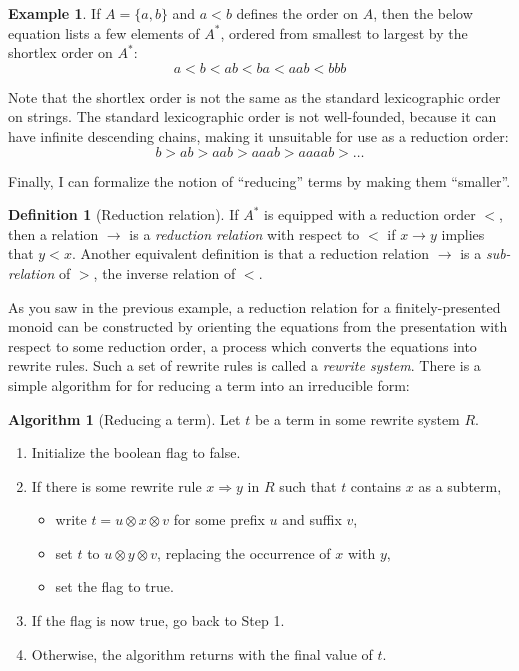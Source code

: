 \documentclass[headsepline,bibliography=totoc]{scrreport}
\theoremstyle{definition}
\newtheorem{example}{Example}[chapter]
\theoremstyle{definition}
\newtheorem{definition}{Definition}[chapter]
\theoremstyle{definition}
\newtheorem{algorithm}{Algorithm}[chapter]
\begin{document}
\begin{example} If $A=\{a,b\}$ and $a<b$ defines the order on $A$, then the below equation lists a few elements of $A^*$, ordered from smallest to largest by the shortlex order on $A^*$:
\[a<b<ab<ba<aab<bbb\]
\end{example}

Note that the shortlex order is not the same as the standard lexicographic order on strings. The standard lexicographic order is not well-founded, because it can have infinite descending chains, making it unsuitable for use as a reduction order:
\[b>ab>aab>aaab>aaaab>\ldots\]

Finally, I can formalize the notion of ``reducing'' terms by making them ``smaller''.
\begin{definition}[Reduction relation]\label{transinvdef} If $A^*$ is equipped with a reduction order $<$, then a relation $\rightarrow$ is a \emph{reduction relation} with respect to $<$ if $x\rightarrow y$ implies that $y<x$. Another equivalent definition is that a reduction relation $\rightarrow$ is a \emph{sub-relation} of $>$, the inverse relation of $<$. 
\end{definition}
As you saw in the previous example, a reduction relation for a finitely-presented monoid can be constructed by orienting the equations from the presentation with respect to some reduction order, a process which converts the equations into rewrite rules. Such a set of rewrite rules is called a \emph{rewrite system}. There is a simple algorithm for for reducing a term into an irreducible form:
\begin{algorithm}[Reducing a term]\label{reducingaterm} Let $t$ be a term in some rewrite system $R$.
\begin{enumerate}
\item Initialize the boolean flag to false.
\item If there is some rewrite rule $x\Rightarrow y$ in $R$ such that $t$ contains $x$ as a subterm,
\begin{itemize}
\item write $t=u\otimes x\otimes v$ for some prefix $u$ and suffix $v$,
\item set $t$ to $u\otimes y\otimes v$, replacing the occurrence of $x$ with $y$,
\item set the flag to true.
\end{itemize}
\item If the flag is now true, go back to Step 1.
\item Otherwise, the algorithm returns with the final value of $t$.
\end{enumerate}
\end{algorithm}
\end{document}
